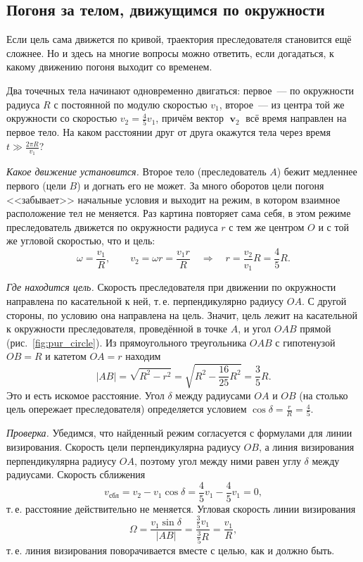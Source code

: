 \documentclass[../main.tex]{subfiles}
\begin{document}
\subsection{Погоня за телом, движущимся по окружности}

Если цель сама движется по кривой, траектория преследователя становится ещё сложнее.
Но и здесь на многие вопросы можно ответить, если догадаться, к какому движению
погоня выходит со временем.

\begin{example}
Два точечных тела начинают одновременно двигаться: первое~--- по окружности радиуса
$R$ с постоянной по модулю скоростью $v_1$, второе~--- из центра той же окружности
со скоростью $v_2 = \frac{4}{5}v_1$, причём вектор $\mbfv_2$ всё время направлен на
первое тело. На каком расстоянии друг от друга окажутся тела через время
$t \gg \frac{2\pi R}{v_1}$?


\noindent\textit{Какое движение установится.} Второе тело (преследователь $A$) бежит
медленнее первого (цели $B$) и догнать его не может. За много оборотов цели погоня
<<забывает>> начальные условия и выходит на режим, в котором взаимное расположение
тел не меняется. Раз картина повторяет сама себя, в этом режиме преследователь
движется по окружности радиуса $r$ с тем же центром $O$ и с той же угловой скоростью,
что и цель:
\[
\omega = \frac{v_1}{R},
\qquad
v_2 = \omega r = \frac{v_1 r}{R}
\quad\Rightarrow\quad
r = \frac{v_2}{v_1}R = \frac{4}{5}R.
\]

\noindent\textit{Где находится цель.} Скорость преследователя при движении по
окружности направлена по касательной к ней, т.\,е. перпендикулярно радиусу $OA$. С
другой стороны, по условию она направлена на цель. Значит, цель лежит на касательной
к окружности преследователя, проведённой в точке $A$, и угол $OAB$ прямой
(рис.~\ref{fig:pur_circle}). Из прямоугольного треугольника $OAB$ с гипотенузой
$OB = R$ и катетом $OA = r$ находим
\[
|AB| = \sqrt{R^2 - r^2} = \sqrt{R^2 - \frac{16}{25}R^2} = \frac{3}{5}R.
\]
Это и есть искомое расстояние. Угол $\delta$ между радиусами $OA$ и $OB$ (на столько
цель опережает преследователя) определяется условием $\cos\delta = \frac{r}{R} = \frac{4}{5}$.

\noindent\textit{Проверка.} Убедимся, что найденный режим согласуется с формулами для
линии визирования. Скорость цели перпендикулярна радиусу $OB$, а линия визирования
перпендикулярна радиусу $OA$, поэтому угол между ними равен углу $\delta$ между
радиусами. Скорость сближения
\[
v_{\text{сбл}} = v_2 - v_1\cos\delta = \frac{4}{5}v_1 - \frac{4}{5}v_1 = 0,
\]
т.\,е. расстояние действительно не меняется. Угловая скорость линии визирования
\[
\Omega = \frac{v_1\sin\delta}{|AB|} = \frac{\frac{3}{5}v_1}{\frac{3}{5}R} = \frac{v_1}{R},
\]
т.\,е. линия визирования поворачивается вместе с целью, как и должно быть.
\end{example}
\end{document}
